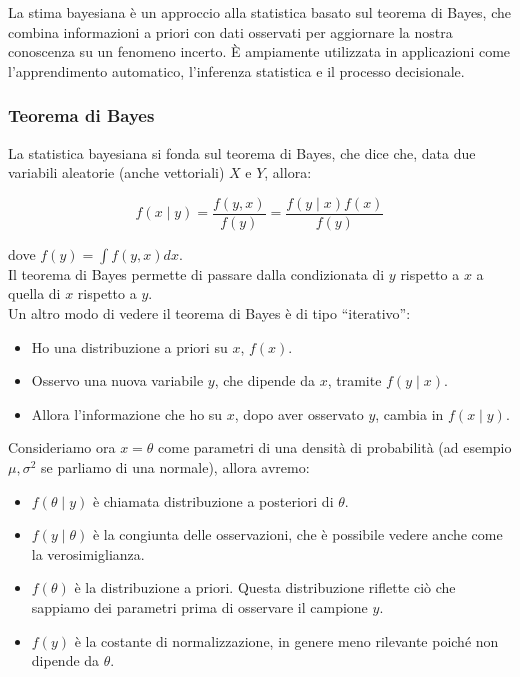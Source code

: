 \documentclass[%
	corpo=11pt,
    twoside,
    stile=classica,
    oldstyle,
    tipotesi=custom,
    greek,
    evenboxes,
]{toptesi}
\begin{document}
La stima bayesiana è un approccio alla statistica basato sul teorema di Bayes, che combina informazioni a priori con dati osservati per aggiornare la nostra conoscenza su un fenomeno incerto. È ampiamente utilizzata in applicazioni come l’apprendimento automatico, l’inferenza statistica e il processo decisionale.

\subsubsection{Teorema di Bayes}

La statistica bayesiana si fonda sul teorema di Bayes, che dice che, data due variabili aleatorie (anche vettoriali) \( X \) e \( Y \), allora:

\[
f(x \mid y) = \frac{f(y, x)}{f(y)} = \frac{f(y \mid x) f(x)}{f(y)}
\]

dove \( f(y) = \int f(y, x)dx \). \\

Il teorema di Bayes permette di passare dalla condizionata di \( y \) rispetto a \( x \) a quella di \( x \) rispetto a \( y \).\\

Un altro modo di vedere il teorema di Bayes è di tipo “iterativo”:
\begin{itemize}
	\item Ho una distribuzione a priori su \( x \), \( f(x) \).
	\item Osservo una nuova variabile \( y \), che dipende da \( x \), tramite \( f(y \mid x) \).
	\item Allora l’informazione che ho su \( x \), dopo aver osservato \( y \), cambia in \( f(x \mid y) \).
\end{itemize}

Consideriamo ora \( x = \theta \) come parametri di una densità di probabilità (ad esempio \( \mu, \sigma^2 \) se parliamo di una normale), allora avremo:

\begin{itemize}
	\item \( f(\theta \mid y) \) è chiamata distribuzione a posteriori di \( \theta \).
	\item \( f(y \mid \theta) \) è la congiunta delle osservazioni, che è possibile vedere anche come la verosimiglianza.
	\item \( f(\theta) \) è la distribuzione a priori. Questa distribuzione riflette ciò che sappiamo dei parametri prima di osservare il campione \( y \).
	\item \( f(y) \) è la costante di normalizzazione, in genere meno rilevante poiché non dipende da \( \theta \).
\end{itemize}
\end{document}

